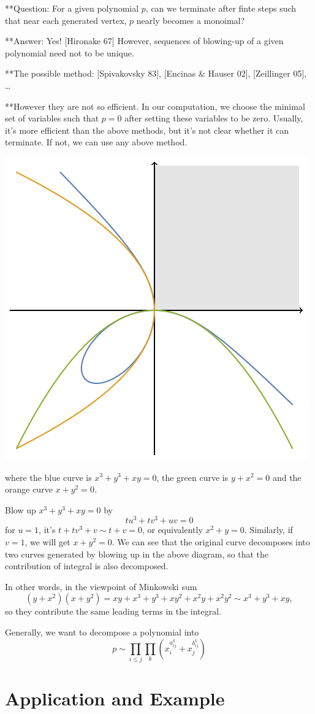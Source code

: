 \documentclass[12pt]{article}
\theoremstyle{definition}
\theoremstyle{plain}
\begin{document}
**Question: For a given polynomial $p$, can we terminate after finte steps 
such that near each generated vertex, $p$ nearly becomes a monoimal?

**Answer: Yes! [Hironake 67] However, sequences of blowing-up of a given polynomial
need not to be unique.

**The possible method: [Spivakovsky 83], [Encinas \& Hauser 02], [Zeillinger 05], \dots

**However they are not so efficient. In our computation, we choose the minimal set of
variables such that $p=0$ after setting these variables to be zero. Usually, it's more 
efficient than the above methods, but it's not clear whether it can terminate. If not,
we can use any above method.

\begin{center}
	\includegraphics[scale=0.8]{fig_2.pdf}	
\end{center}
where the blue curve is $x^3+y^3+xy=0$, the green curve is $y+x^2=0$ and
the orange curve $x+y^2=0$.

Blow up $x^3+y^3+x y=0$ by 
\[
	t u^3+ t v^3+ uv=0
\]
for $u=1$, it's $t +t v^3+ v\sim t+v=0$, or equivalently $x^2+y=0$. 
Similarly, if $v=1$, we will get $x+y^2=0$. We can see that the original curve
decomposes into two curves generated by blowing up in the above diagram, so that 
the contribution of integral is also decomposed.

In other words, in the viewpoint of Minkowski sum
\[
	(y+x^2)(x+y^2)=xy+x^3+y^3+xy^2+x^2y+x^2y^2\sim x^3+y^3+xy,
\]
so they contribute the same leading terms in the integral.

Generally, we want to decompose a polynomial into
\[
	p\sim \prod_{i\leq j} \prod_k (x_i^{a^k_{ij}}+x_j^{b^k_{ij}})
\] 

\section{Application and Example}

\end{document}
